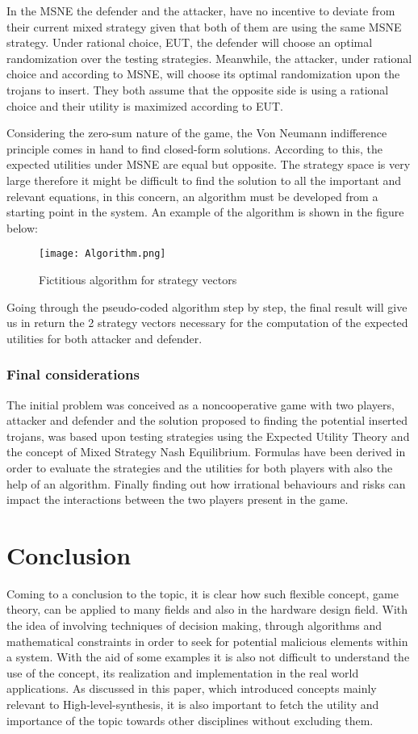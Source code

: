 \documentclass[conference]{IEEEtran}
\begin{document}
{{In the MSNE the defender and the attacker, have no incentive to deviate from their current mixed strategy given that both of them are using the same MSNE strategy. Under rational choice, EUT, the defender will choose an optimal randomization over the testing strategies. Meanwhile, the attacker, under rational choice and according to MSNE, will choose its optimal randomization upon the trojans to insert. They both assume that the opposite side is using a rational choice and their utility is maximized according to EUT.

Considering the zero-sum nature of the game, the Von Neumann indifference principle comes in hand to find closed-form solutions. According to this, the expected utilities under MSNE are equal but opposite. The strategy space is very large therefore it might be difficult to find the solution to all the important and relevant equations, in this concern, an algorithm must be developed from a starting point in the system. An example of the algorithm is shown in the figure below:
\begin{figure}[h]
    \centerline{\texttt{[image: Algorithm.png]}}
    \caption{Fictitious algorithm for strategy vectors}
    \label{algo}
\end{figure} 

Going through the pseudo-coded algorithm step by step, the final result will give us in return the 2 strategy vectors necessary for the computation of the expected utilities for both attacker and defender.

\subsubsection{Final considerations}
The initial problem was conceived as a noncooperative game with two players, attacker and defender and the solution proposed to finding the potential inserted trojans, was based upon testing strategies using the Expected Utility Theory and the concept of Mixed Strategy Nash Equilibrium.
Formulas have been derived in order to evaluate the strategies and the utilities for both players with also the help of an algorithm. Finally finding out how irrational behaviours and risks can impact the interactions between the two players present in the game.

\section{Conclusion}
Coming to a conclusion to the topic, it is clear how such flexible concept, game theory, can be applied to many fields and also in the hardware design field. With the idea of involving techniques of decision making, through algorithms and mathematical constraints in order to seek for potential malicious elements within a system. With the aid of some examples it is also not difficult to understand the use of the concept, its realization and implementation in the real world applications. As discussed in this paper, which introduced concepts mainly relevant to High-level-synthesis, it is also important to fetch the utility and importance of the topic towards other disciplines without excluding them.
}}
\end{document}
